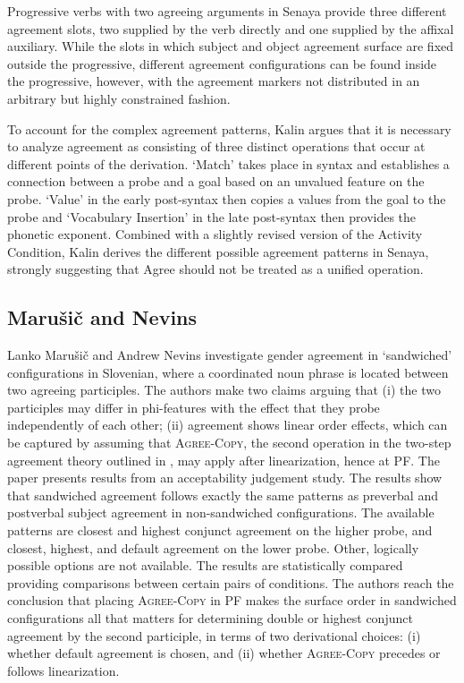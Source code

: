 \documentclass[output=paper
,modfonts
,nonflat]{langsci/langscibook}
\begin{document}
Progressive verbs with two agreeing arguments in Senaya provide three different agreement slots, two supplied by the verb directly and one supplied by the affixal auxiliary. While the slots in which subject and object agreement surface are fixed outside the progressive, different agreement configurations can be found inside the progressive, however, with the agreement markers not distributed in an arbitrary but highly constrained fashion.

To account for the complex agreement patterns, Kalin argues that it is necessary to analyze agreement as consisting of three distinct operations that occur at different points of the derivation. `Match' takes place in syntax and establishes a connection between a probe and a goal based on an unvalued feature on the probe. `Value' in the early post-syntax then copies a values from the goal to the probe and `Vocabulary Insertion' in the late post-syntax then provides the phonetic exponent. Combined with a slightly revised version of the Activity Condition, Kalin derives the different possible agreement patterns in Senaya, strongly suggesting that Agree should not be treated as a unified operation.

\subsection{Maru\v{s}i\v{c} and Nevins}
\label{sec:mandn}

Lanko Marušič and Andrew Nevins investigate gender agreement in ‘sandwiched’ configurations in Slovenian, where a coordinated noun phrase is located between two agreeing participles. The authors make two claims arguing that (i) the two participles may differ in phi-features with the effect that they probe independently of each other; (ii) agreement shows linear order effects, which can be captured by assuming that \textsc{Agree-Copy}, the second operation in the two-step agreement theory outlined in \citet{arreginevins2012}, may apply after linearization, hence at PF. The paper presents results from an acceptability judgement study. The results show that sandwiched agreement follows exactly the same patterns as preverbal and postverbal subject agreement in non-sandwiched configurations. The available patterns are closest and highest conjunct agreement on the higher probe, and closest, highest, and default agreement on the lower probe. Other, logically possible options are not available. The results are statistically compared providing comparisons between certain pairs of conditions. The authors reach the conclusion that placing \textsc{Agree-Copy} in PF makes the surface order in sandwiched configurations all that matters for determining double or highest conjunct agreement by the second participle, in terms of two derivational choices: (i) whether default agreement is chosen, and (ii) whether \textsc{Agree-Copy} precedes or follows linearization.
\end{document}
